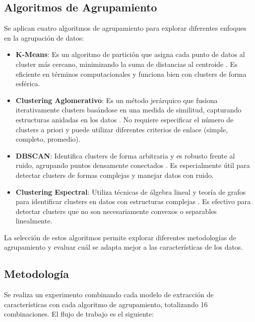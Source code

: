 \subsection{Algoritmos de Agrupamiento}

Se aplican cuatro algoritmos de agrupamiento para explorar diferentes enfoques en la agrupación de datos:

\begin{itemize} \item \textbf{K-Means}: Es un algoritmo de partición que asigna cada punto de datos al cluster más cercano, minimizando la suma de distancias al centroide \cite{macqueen1967some}. Es eficiente en términos computacionales y funciona bien con clusters de forma esférica. \item \textbf{Clustering Aglomerativo}: Es un método jerárquico que fusiona iterativamente clusters basándose en una medida de similitud, capturando estructuras anidadas en los datos \cite{rokach2005clustering}. No requiere especificar el número de clusters a priori y puede utilizar diferentes criterios de enlace (simple, completo, promedio). \item \textbf{DBSCAN}: Identifica clusters de forma arbitraria y es robusto frente al ruido, agrupando puntos densamente conectados \cite{ester1996density}. Es especialmente útil para detectar clusters de formas complejas y manejar datos con ruido. \item \textbf{Clustering Espectral}: Utiliza técnicas de álgebra lineal y teoría de grafos para identificar clusters en datos con estructuras complejas \cite{ng2002spectral}. Es efectivo para detectar clusters que no son necesariamente convexos o separables linealmente. \end{itemize}

La selección de estos algoritmos permite explorar diferentes metodologías de agrupamiento y evaluar cuál se adapta mejor a las características de los datos.

\subsection{Metodología}

Se realiza un experimento combinando cada modelo de extracción de características con cada algoritmo de agrupamiento, totalizando 16 combinaciones. El flujo de trabajo es el siguiente:

